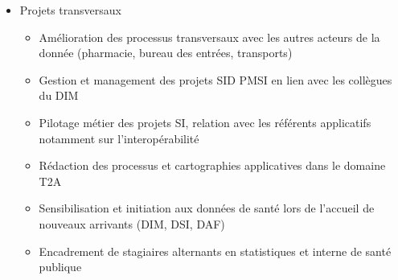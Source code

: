 \documentclass[11pt,a4paper]{moderncv}
\begin{document}
{\begin{itemize}
\begin{itemize}
\end{itemize}
\item Projets transversaux 
\begin{itemize}
\item Amélioration des processus transversaux avec les autres acteurs de la donnée (pharmacie, bureau des entrées, transports)
\item Gestion et management des projets SID PMSI en lien avec les collègues du DIM
\item Pilotage métier des projets SI, relation avec les référents applicatifs notamment sur l'interopérabilité
\item Rédaction des processus et cartographies applicatives dans le domaine T2A
\item Sensibilisation et initiation aux données de santé lors de l’accueil de nouveaux arrivants (DIM, DSI, DAF)
\item Encadrement de stagiaires alternants en statistiques et interne de santé publique
\end{itemize}
\end{itemize}}
\end{document}
